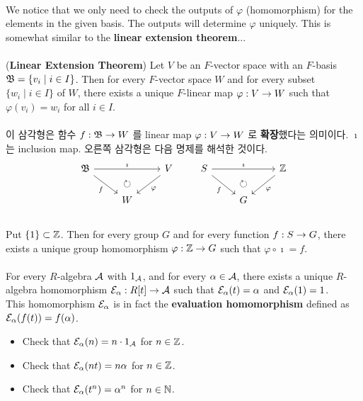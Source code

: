 \\
We notice that we only need to check the outputs of $\varphi$ (homomorphism) for the elements in the given basis. The outputs will determine $\varphi$ uniquely. This is somewhat similar to the \textbf{linear extension theorem}...\\
\\
 (\textbf{Linear Extension Theorem}) Let $V$ be an $F$-vector space with an $F$-basis $\mathfrak{B} = \{v_i \mid i\in I\}$. Then for every $F$-vector space $W$ and for every subset $\{w_i\mid i\in I\}$ of $W$, there exists a unique $F$-linear map $\varphi:V\rightarrow W$ such that $\varphi(v_i) = w_i$ for all $i\in I$.\\
\\
이 삼각형은 함수 $f:\mathfrak{B}\rightarrow W$ 를 linear map $\varphi: V\rightarrow W$ 로 \textbf{확장}했다는 의미이다. $\imath$ 는 inclusion map. 오른쪽 삼각형은 다음 명제를 해석한 것이다.
$$
\begin{tikzcd}
\mf{B} \arrow{rr}{\imath} \arrow[swap]{dr}{f} & \arrow[d, phantom, "\circlearrowright"]& V\arrow{dl}{\varphi} \\
& W  &
\end{tikzcd} \qquad
\begin{tikzcd}
S \arrow{rr}{\imath} \arrow[swap]{dr}{f} & \arrow[d, phantom, "\circlearrowright"]& \Z\arrow{dl}{\varphi} \\
& G  &
\end{tikzcd}
$$
\\
 Put $\{1\}\subset\mathbb{Z}$. Then for every group $G$ and for every function $f:S\rightarrow G$, there exists a unique group homomorphism $\varphi: \mathbb{Z}\rightarrow G$ such that $\varphi\circ \imath = f$.\\
\\
 For every $R$-algebra $\mathcal{A}$ with $1_{\mathcal{A}}$, and for every $\alpha\in \mathcal{A}$, there exists a unique $R$-algebra homomorphism $\mathcal{E}_\alpha:R[t]\rightarrow\mathcal{A}$ such that $\mathcal{E}_\alpha(t) = \alpha$ and $\mathcal{E}_\alpha(1)=1$.\\
This homomorphism $\mathcal{E}_\alpha$ is in fact the \textbf{evaluation homomorphism} defined as $\mathcal{E}_\alpha(f(t)) = f(\alpha)$.
\begin{itemize}
	\item Check that $\mathcal{E}_\alpha(n) = n\cdot 1_{\mathcal{A}}$ for $n\in \mathbb{Z}$.
	\item Check that $\mathcal{E}_\alpha(nt) = n\alpha$ for $n\in \mathbb{Z}$.
	\item Check that $\mathcal{E}_\alpha(t^n) = \alpha^n$ for $n\in \mathbb{N}$.
\end{itemize}~
